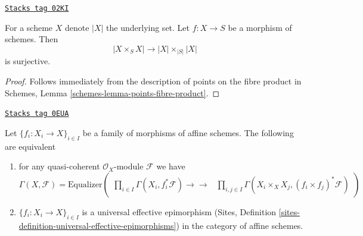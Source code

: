 \begin{lemma}
\label{descent-lemma-equiv-fibre-product}
\href{https://stacks.math.columbia.edu/tag/02KI}{\texttt{Stacks tag 02KI}}

For a scheme $X$ denote $|X|$ the underlying set.
Let $f : X \to S$ be a morphism of schemes.
Then
$$
|X \times_S X| \to |X| \times_{|S|} |X|
$$
is surjective.
\end{lemma}

\begin{proof}
Follows immediately from the description of points on the
fibre product in Schemes, Lemma \ref{schemes-lemma-points-fibre-product}.
\end{proof}


\begin{lemma}
\label{descent-lemma-universal-effective-epimorphism-affine}
\href{https://stacks.math.columbia.edu/tag/0EUA}{\texttt{Stacks tag 0EUA}}

Let $\{f_i : X_i \to X\}_{i \in I}$ be a family of morphisms of affine schemes.
The following are equivalent
\begin{enumerate}
\item for any quasi-coherent $\mathcal{O}_X$-module $\mathcal{F}$ we have
$$
\Gamma(X, \mathcal{F}) =
\text{Equalizer}\left(
\begin{array}{cc}\prod\nolimits_{i \in I} \Gamma(X_i, f_i^*\mathcal{F})
\longrightarrow\longrightarrow & \prod\nolimits_{i, j \in I}
\Gamma(X_i \times_X X_j, (f_i \times f_j)^*\mathcal{F})\end{array}
\right)
$$
\item $\{f_i : X_i \to X\}_{i \in I}$ is a universal effective epimorphism
(Sites, Definition \ref{sites-definition-universal-effective-epimorphisms})
in the category of affine schemes.
\end{enumerate}
\end{lemma}

